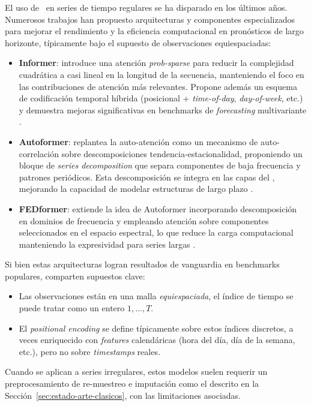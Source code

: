El uso de \Transformers\ en series de tiempo regulares se ha disparado en los últimos años. Numerosos trabajos han propuesto arquitecturas y componentes especializados para mejorar el rendimiento y la eficiencia computacional en pronósticos de largo horizonte, típicamente bajo el supuesto de observaciones equiespaciadas:
\begin{itemize}
    \item \textbf{Informer}: introduce una atención \emph{prob-sparse} para reducir la complejidad cuadrática a casi lineal en la longitud de la secuencia, manteniendo el foco en las contribuciones de atención más relevantes. Propone además un esquema de codificación temporal híbrida (posicional + \emph{time-of-day}, \emph{day-of-week}, etc.) y demuestra mejoras significativas en benchmarks de \emph{forecasting} multivariante \cite{zhou2021informer}.
    \item \textbf{Autoformer}: replantea la auto-atención como un mecanismo de auto-correlación sobre descomposiciones tendencia-estacionalidad, proponiendo un bloque de \emph{series decomposition} que separa componentes de baja frecuencia y patrones periódicos. Esta descomposición se integra en las capas del \Transformer, mejorando la capacidad de modelar estructuras de largo plazo \cite{wu2021autoformer}.
    \item \textbf{FEDformer}: extiende la idea de Autoformer incorporando descomposición en dominios de frecuencia y empleando atención sobre componentes seleccionados en el espacio espectral, lo que reduce la carga computacional manteniendo la expresividad para series largas \cite{zhou2022fedformer}.
\end{itemize}

Si bien estas arquitecturas logran resultados de vanguardia en benchmarks populares, comparten supuestos clave:
\begin{itemize}
    \item Las observaciones están en una malla \textit{equiespaciada}, el índice de tiempo se puede tratar como un entero $1,\dots,T$.
    \item El \emph{positional encoding} se define típicamente sobre estos índices discretos, a veces enriquecido con \emph{features} calendáricas (hora del día, día de la semana, etc.), pero no sobre \emph{timestamps} reales.
\end{itemize}

Cuando se aplican a series irregulares, estos modelos suelen requerir un preprocesamiento de re-muestreo e imputación como el descrito en la Sección~\ref{sec:estado-arte-clasicos}, con las limitaciones asociadas.

